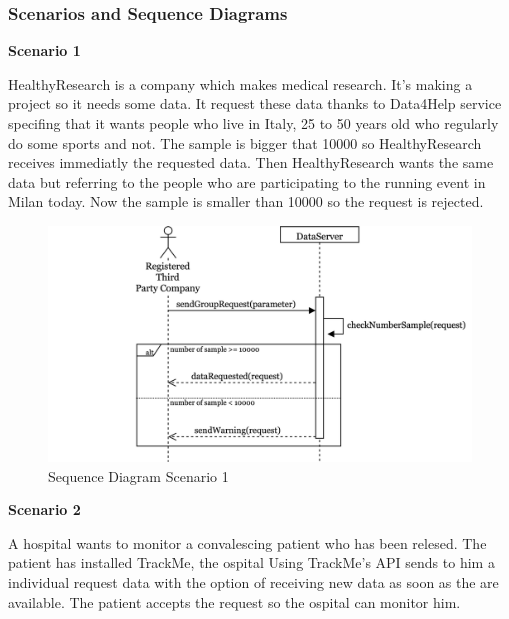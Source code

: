 \documentclass[../main.tex]{subfiles}
\begin{document}
	\subsubsection{Scenarios and Sequence Diagrams}
		\begin{minipage}{\textwidth}
			{\bf Scenario 1}
			\vspace{3mm}

			HealthyResearch is a company which makes medical research. It's making a project so it needs some data. It request these data thanks to Data4Help service specifing that it wants people who live in Italy, 25 to 50 years old who regularly do some sports and not. The sample is bigger that 10000 so HealthyResearch receives immediatly the requested data.
			Then HealthyResearch wants the same data but referring to the people who are participating to the running event in Milan today. Now the sample is smaller than 10000 so the request is rejected.

			\vspace{5mm}
		\end{minipage}
		\begin{figure}[H]
			\centering
			\includegraphics[scale=.3]{images/sequenceDiagram1.png}
			\caption{Sequence Diagram Scenario 1 \label{fig:Sequence Diagram Scenario 1}}
		\end{figure}
		\begin{minipage}{\textwidth}
			{\bf Scenario 2}
			\vspace{3mm}

			A hospital wants to monitor a convalescing patient who has been relesed. The patient has installed TrackMe, the ospital Using TrackMe's API sends to him a individual request data with the option of receiving new data as soon as the are available. The patient accepts the request so the ospital can monitor him.
			\vspace{5mm}
		\end{minipage}
\end{document}
